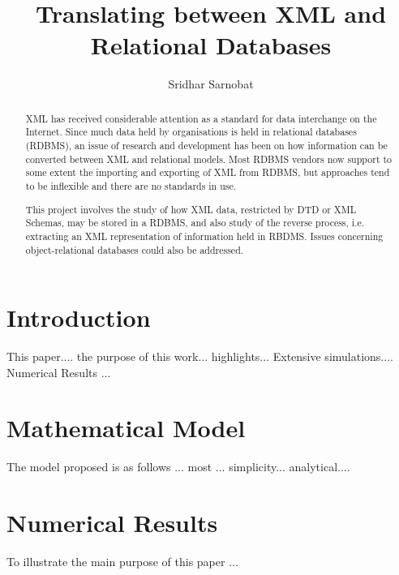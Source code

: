 \documentclass[english,a4]{article}
\title{Translating between XML and Relational Databases}
\author{Sridhar Sarnobat}
\begin{document}
\maketitle

\begin{abstract}

XML has received considerable attention as a standard for data interchange on the Internet. Since much data held by organisations is held in relational databases (RDBMS), an issue of research and development has been on how information can be converted between XML and relational models. Most RDBMS vendors now support to some extent the importing and exporting of XML from RDBMS, but approaches tend to be inflexible and there are no standards in use. 



This project involves the study of how XML data, restricted by DTD or XML Schemas, may be stored in a RDBMS, and also study of the reverse process, i.e. extracting an XML representation of information held in RBDMS. Issues concerning object-relational databases could also be addressed. 

\end{abstract}


\section{Introduction}
\label{N400017}\hypertarget{N400017}{}%

 This paper.... the purpose of this work... highlights...
Extensive simulations.... Numerical Results ...


\section{Mathematical Model}
\label{N40001C}\hypertarget{N40001C}{}%

 The model proposed is as follows ... most ... simplicity...
analytical....


\section{Numerical Results}
\label{N400021}\hypertarget{N400021}{}%

 To illustrate the main purpose of this paper ... 
\end{document}
